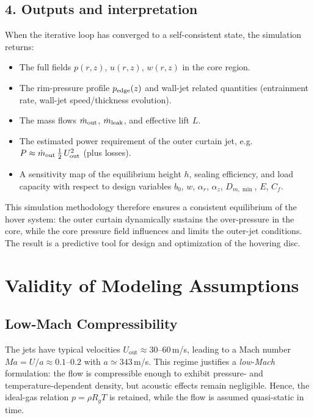 \documentclass[11pt,a4paper]{article}
\begin{document}
\subsection*{4. Outputs and interpretation}
When the iterative loop has converged to a self-consistent state, the simulation returns:
\begin{itemize}
  \item The full fields \(p(r,z)\), \(u(r,z)\), \(w(r,z)\) in the core region.
  \item The rim-pressure profile \(p_{\rm edge}(z)\) and wall-jet related quantities (entrainment rate, wall-jet speed/thickness evolution).
  \item The mass flows \(\dot m_{\rm out}\), \(\dot m_{\rm leak}\), and effective lift \(L\).
  \item The estimated power requirement of the outer curtain jet, e.g.\ \(P \approx \dot m_{\rm out}\,\tfrac12\,U_{\rm out}^2\) (plus losses).
  \item A sensitivity map of the equilibrium height \(h\), sealing efficiency, and load capacity with respect to design variables \(b_0\), \(w\), \(\alpha_r\), \(\alpha_z\), \(D_{m,\min}\), \(E\), \(C_f\).
\end{itemize}
This simulation methodology therefore ensures a consistent equilibrium of the hover system: the outer curtain dynamically sustains the over-pressure in the core, while the core pressure field influences and limits the outer-jet conditions. The result is a predictive tool for design and optimization of the hovering disc.




\section{Validity of Modeling Assumptions}
\label{sec:validity-of-modeling-assumptions}

\subsection{Low-Mach Compressibility}
The jets have typical velocities $U_{\mathrm{out}}\approx30$--$60\,$m/s, leading to a Mach number $Ma=U/a\approx0.1$--$0.2$ with $a\simeq343\,$m/s.
This regime justifies a \emph{low-Mach} formulation: the flow is compressible enough to exhibit pressure- and temperature-dependent density, but acoustic effects remain negligible.
Hence, the ideal-gas relation $p=\rho R_g T$ is retained, while the flow is assumed quasi-static in time.
\end{document}
